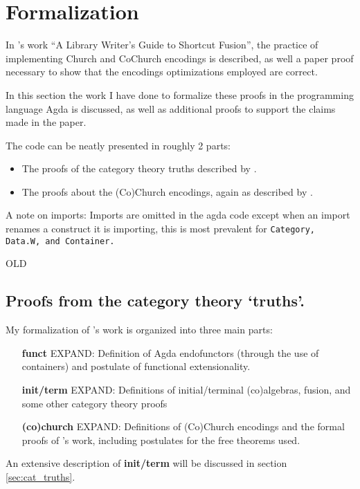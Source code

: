 \section{Formalization}\label{sec:formalization}
In \cite{Harper2011}'s work ``A Library Writer's Guide to Shortcut Fusion'', the practice of implementing Church and CoChurch encodings is described, as well a paper proof necessary to show that the encodings optimizations employed are correct.


In this section the work I have done to formalize these proofs in the programming language Agda is discussed, as well as additional proofs to support the claims made in the paper.

The code can be neatly presented in roughly 2 parts:
\begin{itemize}
  \item The proofs of the category theory truths described by \cite{Harper2011}.
  \item The proofs about the (Co)Church encodings, again as described by \cite{Harper2011}.
\end{itemize}

A note on imports: Imports are omitted in the agda code except when an import renames a construct it is importing, this is most prevalent for \tt{Category}, \tt{Data.W}, and \tt{Container}.




\iffalse
OLD
\subsection{Proofs from the category theory `truths'.}
My formalization of \cite{Harper2011}'s work is organized into three main parts:
\begin{itemize}
    \item[\textbf{funct}] EXPAND: Definition of Agda endofunctors (through the use of containers) and postulate of functional extensionality.
    \item[\textbf{init/term}] EXPAND: Definitions of initial/terminal (co)algebras, fusion, and some other category theory proofs
    \item[\textbf{(co)church}] EXPAND: Definitions of (Co)Church encodings and the formal proofs of \cite{Harper2011}'s work, including postulates for the free theorems used.
\end{itemize}
An extensive description of \textbf{init/term} will be discussed in section \ref{sec:cat_truths}.

